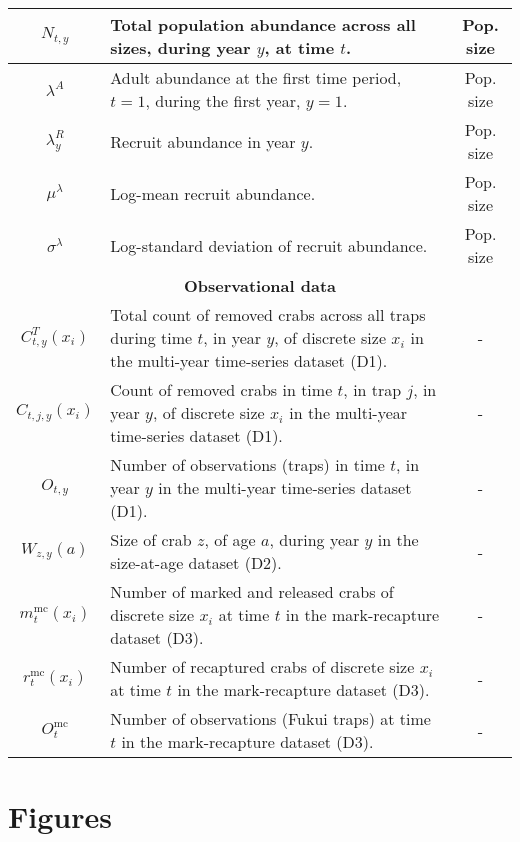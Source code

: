 \documentclass{article}
\begin{document}
\begin{longtable}{||c p{9cm} c||}
 \hline
 $N_{t,y}$ & Total population abundance across all sizes, during year $y$, at time $t$. & Pop. size \\
 \hline
 $\lambda^A$ & Adult abundance at the first time period, $t=1$, during the first year, $y=1$. & Pop. size \\
 \hline
 $\lambda^R_y$ & Recruit abundance in year $y$. & Pop. size \\
 \hline
 $\mu^{\lambda}$ & Log-mean recruit abundance. & Pop. size \\
 \hline
 $\sigma^{\lambda}$ & Log-standard deviation of recruit abundance. & Pop. size \\
 \hline\hline
 \multicolumn{3}{||c||}{\textbf{Observational data}} \\ 
 \hline
 $C^T_{t,y}(x_i)$ & Total count of removed crabs across all traps during time $t$, in year $y$, of discrete size $x_i$ in the multi-year time-series dataset (D1). & - \\ 
 \hline
 $C_{t,j,y}(x_i)$ & Count of removed crabs in time $t$, in trap $j$, in year $y$, of discrete size $x_i$ in the multi-year time-series dataset (D1). & - \\
 \hline
 $O_{t,y}$ & Number of observations (traps) in time $t$, in year $y$ in the multi-year time-series dataset (D1). & - \\
 \hline
 $W_{z, y}(a)$ & Size of crab $z$, of age $a$, during year $y$ in the size-at-age dataset (D2). & - \\
 \hline
 $m^{\text{mc}}_t(x_i)$ & Number of marked and released crabs of discrete size $x_i$ at time $t$ in the mark-recapture dataset (D3). & - \\
 \hline
 $r^{\text{mc}}_t(x_i)$ & Number of recaptured crabs of discrete size $x_i$ at time $t$ in the mark-recapture dataset (D3). & - \\
 \hline
 $O^{\text{mc}}_t$ & Number of observations (Fukui traps) at time $t$ in the mark-recapture dataset (D3). & - \\
 \hline
\end{longtable}

\section{Figures}
\end{document}
